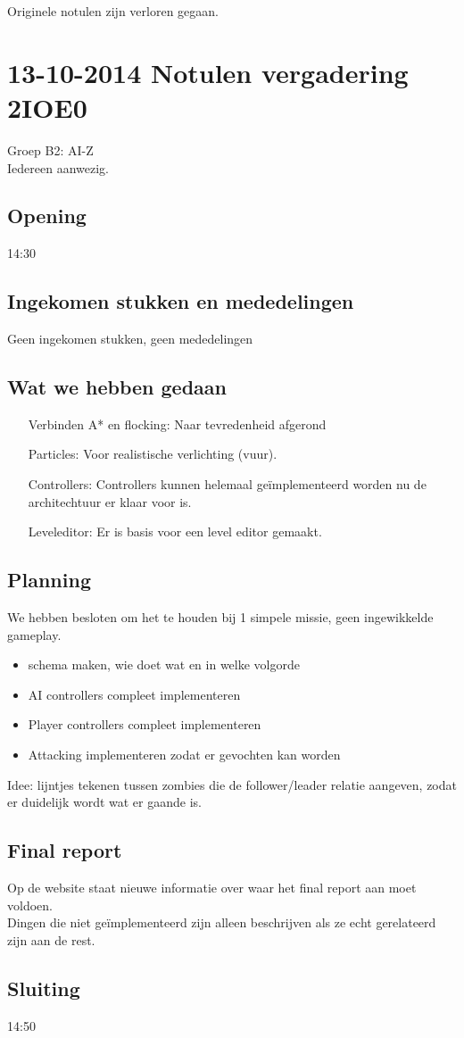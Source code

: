 \documentclass[a4paper,10pt]{article}
\begin{document}
Originele notulen zijn verloren gegaan.

\section*{13-10-2014 Notulen vergadering 2IOE0}
Groep B2: AI-Z\\
Iedereen aanwezig.

\subsection*{Opening} 14:30

\subsection*{Ingekomen stukken en mededelingen}
Geen ingekomen stukken, geen mededelingen

\subsection*{Wat we hebben gedaan}
\begin{itemize}
 \item [Verbinden A* en flocking:] Naar tevredenheid afgerond
 \item [Particles:] Voor realistische verlichting (vuur).
 \item [Controllers:] Controllers kunnen helemaal ge\"implementeerd worden nu de architechtuur er klaar voor is.
 \item [Leveleditor:] Er is basis voor een level editor gemaakt.
\end{itemize}

\subsection*{Planning}
We hebben besloten om het te houden bij 1 simpele missie, geen ingewikkelde gameplay.
\begin{itemize}
 \item schema maken, wie doet wat en in welke volgorde
 \item AI controllers compleet implementeren
 \item Player controllers compleet implementeren
 \item Attacking implementeren zodat er gevochten kan worden
\end{itemize}
Idee: lijntjes tekenen tussen zombies die de follower/leader relatie aangeven, zodat er duidelijk wordt wat er gaande is.

\subsection*{Final report}
Op de website staat nieuwe informatie over waar het final report aan moet voldoen.\\
Dingen die niet ge\"implementeerd zijn alleen beschrijven als ze echt gerelateerd zijn aan de rest.

\subsection*{Sluiting} 14:50
\end{document}
